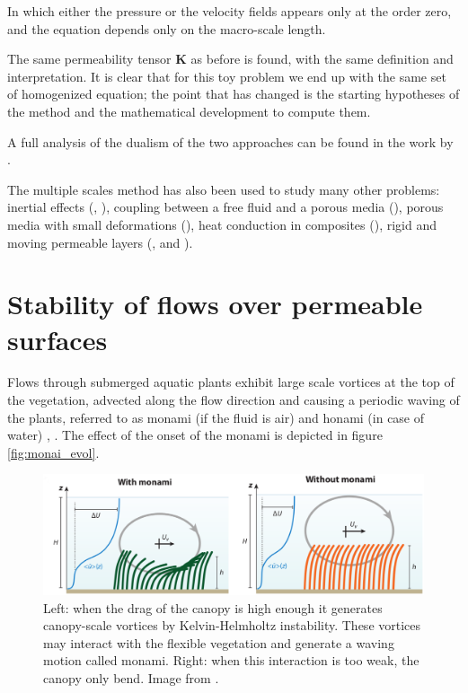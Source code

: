 In which either the pressure or the velocity fields appears only at the order zero, and the equation depends only on the macro-scale length.

The same permeability tensor $\mathbf{K}$ as before is found, with the same definition and interpretation.
It is clear that for this toy problem we end up with the same set of homogenized equation; the point that has changed is the starting hypotheses of the method and the mathematical development to compute them.

A full analysis of the dualism of the two approaches can be found in the work by \citet{davit2013homogenization}.

The multiple scales method has also been used to study many other problems: inertial effects (\citet{mei1991effect}, \citet{skjetne1999new}), coupling between a free fluid and a porous media (\citet{mikelic2000interface}), porous media with small deformations (\citet{auriault1977etude}), heat conduction in composites (\citet{auriault1983effective}), rigid and moving permeable layers (\citet{zampogna2016fluid}, \citet{ugis} and \citet{zampogna2017pelskin}).



\section{Stability of flows over permeable surfaces}
\label{sec:stability}

Flows through submerged aquatic plants exhibit large scale vortices at the top of the vegetation,
advected along the flow direction and causing a periodic waving of the plants, referred to as
monami (if the fluid is air) and honami (in case of water) \citet{inoue1955studies}, \citet{ackerman1993reduced}.
The effect of the onset of the monami is depicted in figure \ref{fig:monai_evol}.

\begin{figure}[h]
	\centering
	\includegraphics[width=1\linewidth]{chapter_1/monami}
	\caption{Left: when the drag of the canopy is high enough it generates canopy-scale vortices by Kelvin-Helmholtz instability. These vortices may interact with the flexible vegetation and generate a waving motion called monami. Right: when this interaction is too weak, the canopy only bend. Image from \citet{nepf2012flow}.}
	\label{fig:monami}
\end{figure}

